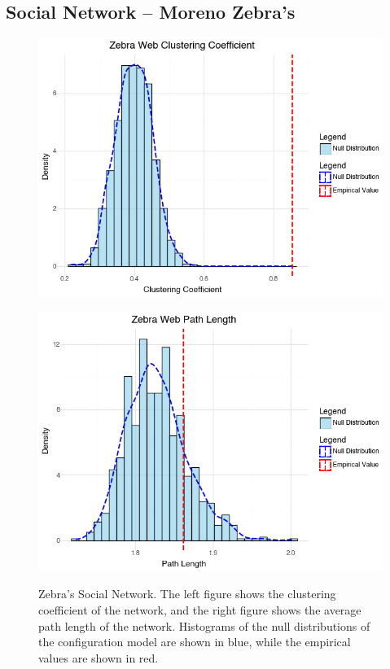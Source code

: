 \documentclass[12pt]{article}
\begin{document}
\subsection*{Social Network -- Moreno Zebra's}
\begin{figure}[h]
    \centering
    \begin{minipage}{0.45\textwidth}
        \centering
        \includegraphics[width=\textwidth]{../figures/zebra_clustering.png}
        \label{fig:zebra_network_clustering}
    \end{minipage}
    \hfill
    \begin{minipage}{0.45\textwidth}
        \centering
        \includegraphics[width=\textwidth]{../figures/zebra_path.png}
        \label{fig:zebra_network_pathlength}
    \end{minipage}
    \caption{Zebra's Social Network. The left figure shows the clustering coefficient of the network, and the right figure shows the average path length of the network. Histograms of the null distributions of the configuration model are shown in blue, while the empirical values are shown in red.}
    \label{fig:zebra_network}
\end{figure}
\end{document}
